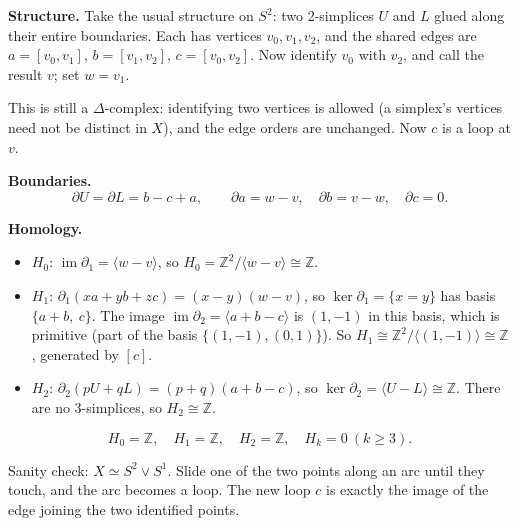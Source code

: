 \documentclass[11pt]{article}
\newcommand{\Z}{\mathbb Z}
\newcommand{\im}{\operatorname{im}}
\begin{document}
\textbf{Structure.} Take the usual structure on $S^2$: two 2-simplices $U$ and $L$ glued along their entire boundaries. Each has vertices $v_0,v_1,v_2$, and the shared edges are $a=[v_0,v_1]$, $b=[v_1,v_2]$, $c=[v_0,v_2]$. Now identify $v_0$ with $v_2$, and call the result $v$; set $w=v_1$.
\begin{center}
\end{center}
This is still a $\Delta$-complex: identifying two vertices is allowed (a simplex's vertices need not be distinct in $X$), and the edge orders are unchanged. Now $c$ is a loop at $v$.

\textbf{Boundaries.}
\[\partial U=\partial L=b-c+a,\qquad\partial a=w-v,\quad\partial b=v-w,\quad\partial c=0.\]

\textbf{Homology.}
\begin{itemize}
\item $H_0$: $\im\partial_1=\langle w-v\rangle$, so $H_0=\Z^2/\langle w-v\rangle\cong\Z$.
\item $H_1$: $\partial_1(xa+yb+zc)=(x-y)(w-v)$, so $\ker\partial_1=\{x=y\}$ has basis $\{a+b,\ c\}$. The image $\im\partial_2=\langle a+b-c\rangle$ is $(1,-1)$ in this basis, which is primitive (part of the basis $\{(1,-1),(0,1)\}$). So $H_1\cong\Z^2/\langle(1,-1)\rangle\cong\Z$, generated by $[c]$.
\item $H_2$: $\partial_2(pU+qL)=(p+q)(a+b-c)$, so $\ker\partial_2=\langle U-L\rangle\cong\Z$. There are no 3-simplices, so $H_2\cong\Z$.
\end{itemize}
\[\boxed{H_0=\Z,\quad H_1=\Z,\quad H_2=\Z,\quad H_k=0\ (k\ge3).}\]
\begin{note}
Sanity check: $X\simeq S^2\vee S^1$. Slide one of the two points along an arc until they touch, and the arc becomes a loop. The new loop $c$ is exactly the image of the edge joining the two identified points.
\end{note}
\end{document}
